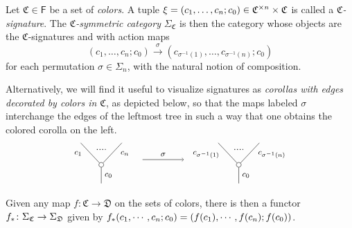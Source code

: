 \documentclass[a4paper,10pt
,draft
]{article}%
\renewcommand{\1}{\eta}%
\begin{document}
\begin{definition}\label{CSYM DEF}
	Let $\mathfrak {C} \in \mathsf{F}$ be a set of \textit{colors}.
	A tuple
	$\xi = (c_1, \ldots, c_n; c_0) \in \mathfrak C^{\times n} \times \mathfrak C$
	is called a \textit{$\mathfrak {C}$-signature}.
	The \textit{$\mathfrak C$-symmetric category} $\Sigma_{\mathfrak C}$ is then the category whose objects are the $\mathfrak{C}$-signatures and with action maps
\[
(c_1, \ldots, c_n; c_0) \xrightarrow{\sigma} (c_{\sigma^{-1}(1)}, \ldots, c_{\sigma^{-1}(n)}; c_0)
\]
	for each permutation $\sigma \in \Sigma_n$, with the natural notion of composition.

Alternatively, we will find it useful to visualize signatures as \textit{corollas with edges decorated by colors in $\mathfrak{C}$}, as depicted below, so that the maps labeled $\sigma$ interchange the edges of the leftmost tree in such a way that one obtains the colored corolla on the left.
\[
\begin{tikzpicture}
[grow=up,auto,level distance=2.3em,every node/.style = {font=\footnotesize},dummy/.style={circle,draw,inner sep=0pt,minimum size=1.75mm}]
	\node at (0,0) [font=\normalsize]{}
		child{node [dummy] {}
			child{
			edge from parent node [swap,near end] {$c_n$} node [name=Kn] {}}
			child{
			edge from parent node [near end] {$c_1$}
node [name=Kone,swap] {}}
		edge from parent node [swap] {$c_0$}
		};
		\draw [dotted,thick] (Kone) -- (Kn) ;
	\node at (5,0) [font=\normalsize]{}
		child{node [dummy] {}
			child{
			edge from parent node [swap,near end] {$c_{\sigma^{-1}(n)}$} node [name=Kn] {}}
			child{
			edge from parent node [near end] {$c_{\sigma^{-1}(1)}$}
node [name=Kone,swap] {}}
		edge from parent node [swap] {$c_0$}
		};
		\draw [dotted,thick] (Kone) -- (Kn) ;

\draw[->] (1.5,1) -- node{$\sigma$} (3,1);
\end{tikzpicture}
\]
Given any map $f \colon \mathfrak{C} \to \mathfrak{D}$ on the sets of colors, there is then a functor
$f_{\**} \colon \Sigma_{\mathfrak{C}} \to \Sigma_{\mathfrak{D}}$
given by $f_{\**} (c_1,\cdots,c_n;c_0) = (f(c_1),\cdots,f(c_n);f(c_0))$. 
\end{definition}
\end{document}
